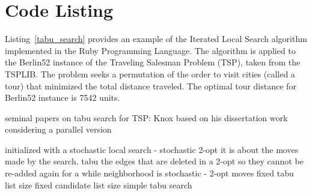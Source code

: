 \documentclass[a4paper, 11pt]{article}
\begin{document}
\section{Code Listing}
\label{sec:code}
Listing~\ref{tabu_search} provides an example of the Iterated Local Search algorithm implemented in the Ruby Programming Language. 
The algorithm is applied to the Berlin52 instance of the Traveling Salesman Problem (TSP), taken from the TSPLIB. The problem seeks a permutation of the order to visit cities (called a tour) that minimized the total distance traveled. The optimal tour distance for Berlin52 instance is 7542 units.

seminal papers on tabu search for TSP: Knox \cite{Knox1994} based on his dissertation work
considering a parallel version \cite{Fiechter1994}


initialized with a stochastic local search - stochastic 2-opt
it is about the moves made by the search. tabu the edges that are deleted in a 2-opt so they cannot be re-added again for a while
neighborhood is stochastic - 2-opt moves
fixed tabu list size
fixed candidate list size
simple tabu search




\end{document}
